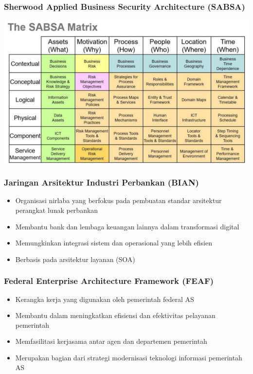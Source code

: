 \documentclass{beamer}
\begin{document}
	{
		\begin{frame}
			\frametitle{Sherwood Applied Business Security Architecture (SABSA)}
			\begin{center}
				\includegraphics[width=1\textwidth]{../figures/sabsa}
			\end{center}
		\end{frame}
	}

	\begin{frame}
		\frametitle{Jaringan Arsitektur Industri Perbankan (BIAN)}
		\begin{itemize}
			\item Organisasi nirlaba yang berfokus pada pembuatan standar arsitektur perangkat lunak perbankan
			\item Membantu bank dan lembaga keuangan lainnya dalam transformasi digital
			\item Memungkinkan integrasi sistem dan operasional yang lebih efisien
			\item Berbasis pada arsitektur layanan (SOA)
		\end{itemize}
	\end{frame}
	
	\begin{frame}
		\frametitle{Federal Enterprise Architecture Framework (FEAF)}
		\begin{itemize}
			\item Kerangka kerja yang digunakan oleh pemerintah federal AS
			\item Membantu dalam meningkatkan efisiensi dan efektivitas pelayanan pemerintah
			\item Memfasilitasi kerjasama antar agen dan departemen pemerintah
			\item Merupakan bagian dari strategi modernisasi teknologi informasi pemerintah AS
		\end{itemize}
	\end{frame}
	
\end{document}
